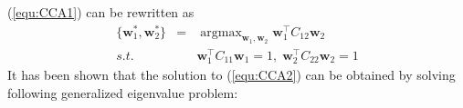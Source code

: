 \documentclass[a4paper]{article}
\newcommand{\argmax}{\mathop\mathrm{argmax}}
\begin{document}
(\ref{equ:CCA1}) can be rewritten as   
\begin{eqnarray}
        \{\mathbf{w}_1^*,\mathbf{w}_2^*\} &=& \argmax_{\mathbf{w}_1,\mathbf{w}_2}\mathbf{w}_1^\top C_{12} \mathbf{w}_2     \label{equ:CCA2}\\
                     s.t.    & &  \mathbf{w}_1^\top C_{11} \mathbf{w}_1=1,\; \mathbf{w}_2^\top C_{22} \mathbf{w}_2=1 \nonumber
\end{eqnarray}
It has been shown \citep{Bie_05,HardoonSS04} that the solution to (\ref{equ:CCA2}) can be obtained by solving following generalized eigenvalue problem:   
\end{document}

